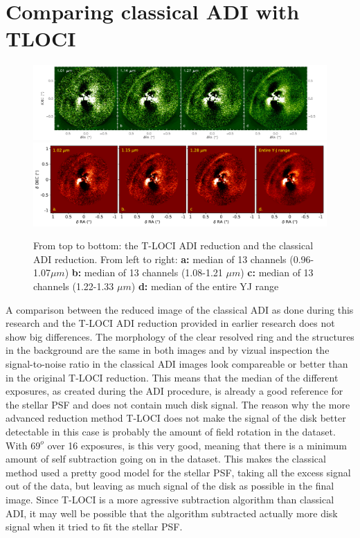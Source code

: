 \documentclass[twoside,single,12pt]{lion-msc}
\begin{document}
\section{Comparing classical ADI with TLOCI}
\begin{figure}[!b]
\centering
\vspace{-0.3cm}
\includegraphics[trim={0.3cm 0cm 1.2cm 0cm},clip,width = .985\textwidth]{ifsjos}
\includegraphics[trim={0cm 0cm 0cm 0cm},clip,width = \textwidth]{ADIwavelplot}
\caption{From top to bottom: the T-LOCI ADI reduction and the classical ADI reduction. From left to right: \textbf{a:} median of 13 channels (0.96-1.07$\mu m$) \textbf{b:} median of 13 channels (1.08-1.21 $\mu m$) \textbf{c:} median of 13 channels (1.22-1.33 $\mu m$) \textbf{d:} median of the entire YJ range}
\label{fig:coloroverpos}
\vspace{-0.5cm}
\end{figure}

A comparison between the reduced image of the classical ADI as done during this research and the T-LOCI ADI reduction provided in earlier research does not show big differences. The morphology of the clear resolved ring and the structures in the background are the same in both images and by vizual inspection the signal-to-noise ratio in the classical ADI images look compareable or better than in the original T-LOCI reduction. This means that the median of the different exposures, as created during the ADI procedure, is already a good reference for the stellar PSF and does not contain much disk signal. The reason why the more advanced reduction method T-LOCI does not make the signal of the disk better detectable in this case is probably the amount of field rotation in the dataset. With $69^o$ over 16 exposures, is this very good, meaning that there is a minimum amount of self subtraction going on in the dataset. This makes the classical method used a pretty good model for the stellar PSF, taking all the excess signal out of the data, but leaving as much signal of the disk as possible in the final image. Since T-LOCI is a more agressive subtraction algorithm than classical ADI, it may well be possible that the algorithm subtracted actually more disk signal when it tried to fit the stellar PSF. 
\end{document}
